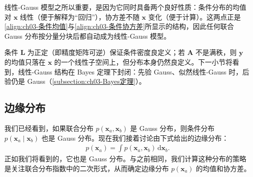 \documentclass[../../main.tex]{subfiles}
\begin{document}
\begin{remark}
线性-Gauss 模型之所以重要，是因为它同时具备两个良好性质：条件分布的均值对 $\boldsymbol{x}$ 线性（便于解释为“回归”），协方差不随 $\boldsymbol{x}$ 变化（便于计算）。这两点正是\eqref{align:ch03-条件均值}与\eqref{align:ch03-条件协方差}所显示的结构，因此任何联合 Gauss 分布按分量分块后都自动成为线性-Gauss 模型。

条件 $\boldsymbol{L}$ 为正定（即精度矩阵可逆）保证条件密度良定义；若 $\boldsymbol{A}$ 不是满秩，则 $\boldsymbol{y}$ 的均值只落在 $\boldsymbol{x}$ 的一个线性子空间上，但分布本身仍然良定义。下一小节将看到，线性-Gauss 结构在 Bayes 定理下封闭：先验 Gauss、似然线性-Gauss 时，后验仍是 Gauss（\cref{subsection:ch03-Bayes定理}）。
\end{remark}

\subsection{边缘分布}\label{subsection:ch03-边缘分布}

我们已经看到，如果联合分布 $p(\boldsymbol{x}_{a},\boldsymbol{x}_{b})$ 是 Gauss 分布，则条件分布 $p(\boldsymbol{x}_{a}\mid\boldsymbol{x}_{b})$ 也是 Gauss 分布。现在我们接着讨论由下式给出的边缘分布：
\begin{align}
p(\boldsymbol{x}_{a})=\int p(\boldsymbol{x}_{a},\boldsymbol{x}_{b})\,\mathrm{d}\boldsymbol{x}_{b}.
\label{align:ch03-边缘积分}
\end{align}
正如我们将看到的，它也是 Gauss 分布。与之前相同，我们计算这种分布的策略是关注联合分布指数中的二次形式，从而确定边缘分布 $p(\boldsymbol{x}_{a})$ 的均值和协方差。
\end{document}
